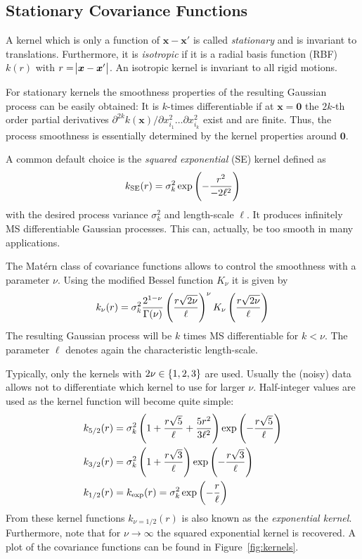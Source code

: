 \documentclass[11pt,a4paper,twoside,BCOR=15mm]{scrreprt}
\newcommand{\vc}[1]{\bm{#1}}
\newcommand{\ped}[1]{_{\mathrm{#1}}}
\newcommand{\newterm}[1]{\emph{#1}}
\begin{document}
\subsection{Stationary Covariance Functions}
A kernel which is only a function of $\vc x - \vc x'$ is called 
\newterm{stationary} and is invariant to translations. Furthermore, it is 
\newterm{isotropic} if it is a radial basis function (RBF) $k(r)$ with $r 
= \abs{\vc x - \vc x'}$.  An isotropic kernel is invariant to all rigid motions.

For stationary kernels the smoothness properties of the resulting Gaussian 
process can be easily obtained: It is $k$-times differentiable if at $\vc 
x = \vc 0$ the $2k$-th order partial derivatives $\partial^{2k} k(\vc x) 
/ \partial x_{i_1}^2 \dots \partial x_{i_k}^2$ exist and are finite. Thus, the 
process smoothness is essentially determined by the kernel properties around 
$\vc 0$.

A common default choice is the \newterm{squared exponential} (SE) kernel defined 
as
\begin{equation}
    k\ped{SE}(r) = \sigma_k^2 \exp\del{-\frac{r^2}{-2\ell^2}}
\end{equation}
with the desired process variance $\sigma_k^2$ and length-scale $\ell$. It 
produces infinitely MS differentiable Gaussian processes. This can, actually, be 
too smooth in many applications.

The Mat\'ern class of covariance functions allows to control the smoothness with 
a parameter $\nu$. Using the modified Bessel function $K_{\nu}$ it is given by
\begin{equation}
    k_{\nu}(r) = \sigma_k^2 \frac{2^{1-\nu}}{\Gamma(\nu)} 
    \del{\frac{r\sqrt{2\nu}}{\ell}}^{\nu} K_{\nu} 
    \del{\frac{r\sqrt{2\nu}}{\ell}}
\end{equation}
The resulting Gaussian process will be $k$ times MS differentiable for $k 
< \nu$. The parameter $\ell$ denotes again the characteristic length-scale.

Typically, only the kernels with $2\nu \in \cbr{1, 2, 3}$ are used.  Usually the 
(noisy) data allows not to differentiate which kernel to use for larger $\nu$.  
Half-integer values are used as the kernel function will become quite simple:
\begin{align}
    k_{5/2}(r) &= \sigma_k^2 \del{1 + \frac{r\sqrt{5}}{\ell} 
        + \frac{5r^2}{3\ell^2}} \exp\del{-\frac{r\sqrt{5}}{\ell}} \\
    k_{3/2}(r) &= \sigma_k^2 \del{1 + \frac{r\sqrt{3}}{\ell}} 
    \exp\del{-\frac{r\sqrt{3}}{\ell}} \\
    k_{1/2}(r) &= k_{\exp}(r) = \sigma_k^2 \exp\del{-\frac{r}{\ell}}
\end{align}
From these kernel functions $k_{\nu=1/2}(r)$ is also known as the 
\newterm{exponential kernel}. Furthermore, note that for $\nu \rightarrow 
\infty$ the squared exponential kernel is recovered. A plot of the covariance 
functions can be found in Figure~\ref{fig:kernels}.
\end{document}
